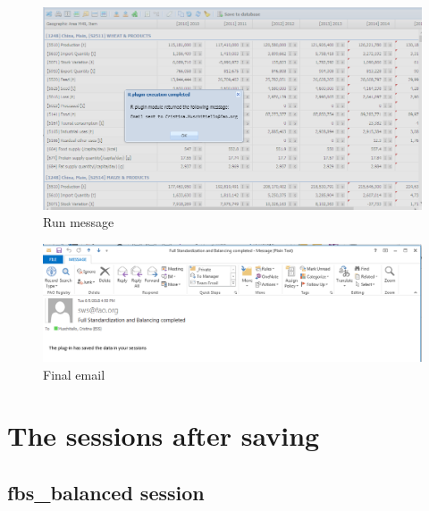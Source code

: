 \documentclass[]{article}
\begin{document}
\begin{figure}[H]

{\centering \includegraphics[width=1\linewidth]{images/standPlugin/33_finalEmailmessage} 

}

\caption{\label{fig:f33}Run message}\label{fig:f33}
\end{figure}

\begin{figure}[H]

{\centering \includegraphics[width=1\linewidth]{images/standPlugin/34_finalEmail} 

}

\caption{\label{fig:f34}Final email}\label{fig:f34}
\end{figure}

\section{The sessions after saving}\label{the-sessions-after-saving}

\subsection{fbs\_balanced session}\label{fbs_balanced-session}
\end{document}
